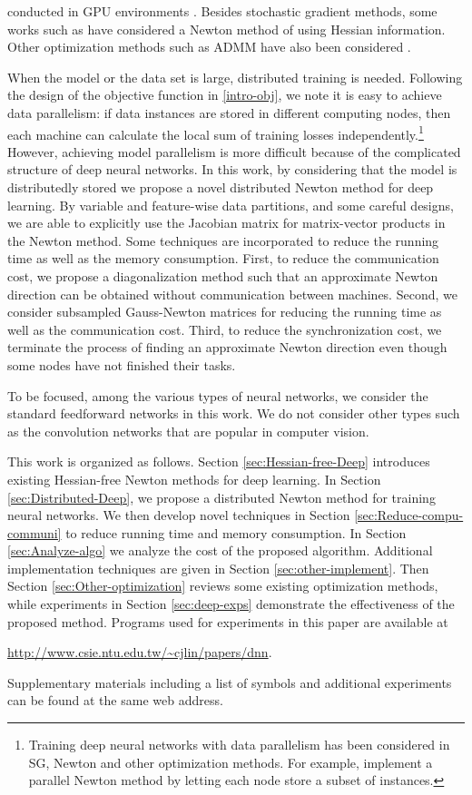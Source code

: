\documentclass[12pt]{article}
\begin{document}
conducted in GPU environments \citep[e.g.,][]{DCC10a,AK12b,GEH12a}. Besides stochastic gradient methods, some works such as \cite{JM10a,RK13a,XH16a} have considered a Newton method of 
using Hessian information. Other optimization methods such as ADMM have also been considered \citep{GT16a}.
\par When the model or the data set is large, distributed training is needed. Following the design of the objective function in \eqref{intro-obj}, we note it is easy to achieve data parallelism: if data instances are stored in different computing nodes, then each machine can calculate the local sum of training losses independently.\footnote{Training deep neural networks with data parallelism has been considered in SG, Newton and other optimization methods. For example, \cite{KH15a} implement a parallel Newton method by letting each node store a subset of instances.} However, achieving model parallelism is more difficult because of the complicated structure of deep neural networks. In this work, by considering that the model is distributedly stored we propose a novel distributed Newton method for deep learning.
By variable and feature-wise data partitions, and some careful designs, we are able to explicitly use the Jacobian matrix for matrix-vector products in the Newton method.
Some techniques are incorporated to reduce the running time as well as the memory consumption.
First, to reduce the communication cost, we propose a diagonalization method such that an approximate Newton direction can be obtained without communication between machines.
Second, we consider subsampled Gauss-Newton matrices for reducing the running time as well as the communication cost.
Third, to reduce the synchronization cost, we terminate the process of finding an approximate Newton direction even though some nodes have not finished their tasks.
\par To be focused, among the various types of neural networks, we consider the standard feedforward networks in this work. We do not consider other types
such as the convolution networks that are popular in computer vision.
\par This work is organized as follows. Section \ref{sec:Hessian-free-Deep} introduces existing Hessian-free Newton methods for deep learning.
In Section \ref{sec:Distributed-Deep}, we propose a distributed Newton method for training neural networks. We then develop novel techniques in Section \ref{sec:Reduce-compu-communi}
to reduce running time and memory consumption. In Section \ref{sec:Analyze-algo} we analyze the cost of the proposed algorithm.
Additional implementation techniques are given in Section \ref{sec:other-implement}. 
Then Section \ref{sec:Other-optimization} reviews some existing optimization methods, while experiments in Section \ref{sec:deep-exps} demonstrate the effectiveness of the proposed method.
Programs used for experiments in this paper are available at
\begin{center}\url{http://www.csie.ntu.edu.tw/~cjlin/papers/dnn}.\end{center}
Supplementary materials including a list of symbols and additional experiments can be found at the same web address.
\end{document}
